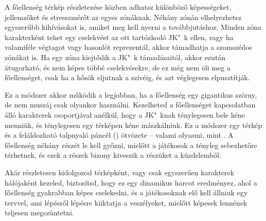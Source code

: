 A főellenség térkép részletezése közben adhatsz különböző képességeket, jellemzőket és stresszmérőt az egyes zónáknak. Néhány zónán elhelyezhetsz egyszerűbb kihívásokat is, amiket meg kell nyerni a továbbjutáshoz. Minden zóna karakterként tehet egy cselekvést az ott tartózkodó JK"~k ellen, vagy ha valamiféle végtagot vagy hasonlót reprezentál, akkor támadhatja a szomszédos zónákat is. Ha egy zóna kiejtődik a JK"~k támadásaitól, akkor ezután átugorható, és nem képes többé cselekvésekre, de ez még nem öli meg a főellenséget, csak ha a hősök eljutnak a szívéig, és azt véglegesen elpusztítják.

Ez a módszer akkor működik a legjobban, ha a főellenség egy gigantikus szörny, de nem muszáj csak olyankor használni. Kezelheted a főellenséget kapcsolatban álló karakterek csoportjával anélkül, hogy a JK"~knak ténylegesen bele kéne menniük, és ténylegesen egy térképen kéne mászkálniuk. Ez a módszer egy térkép és a feláldozható talpnyaló páncél () ötvözete – valami olyasmi, mint . A főellenség néhány részét le kell győzni, mielőtt a játékosok a tényleg sebezhetőre térhetnek, és ezek a részek bizony kiveszik a részüket a küzdelemből.

Akár részletesen kidolgozod térképként, vagy csak egyszerűen karakterek hálójaként kezeled, biztosítsd, hogy ez egy dinamikus harcot eredményez, ahol a főellenség gyakrabban képes cselekedni, és a játékosoknak elő kell állniuk egy tervvel, ami lépésről lépésre kiiktatja a veszélyeket, mielőtt képesek lennének teljesen megszüntetni.
